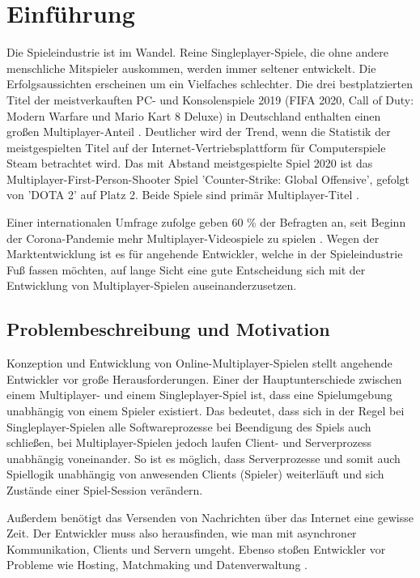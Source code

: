 \chapter{Einführung}
\label{sec:einfuehrung}

Die Spieleindustrie ist im Wandel. Reine Singleplayer-Spiele, die ohne andere menschliche Mitspieler auskommen, werden immer seltener entwickelt. Die Erfolgsaussichten erscheinen um ein Vielfaches schlechter. Die drei bestplatzierten Titel der meistverkauften PC- und Konsolenspiele 2019 (FIFA 2020, Call of Duty: Modern Warfare und Mario Kart 8 Deluxe) in Deutschland enthalten einen großen Multiplayer-Anteil \cite{gameVerbandderdeutschenGamesBranchee.V..2020}. Deutlicher wird der Trend, wenn die Statistik der meistgespielten Titel auf der Internet-Vertriebsplattform für Computerspiele Steam betrachtet wird. Das mit Abstand meistgespielte Spiel 2020 ist das Multiplayer-First-Person-Shooter Spiel 'Counter-Strike: Global Offensive', gefolgt von 'DOTA 2' auf Platz 2. Beide Spiele sind primär Multiplayer-Titel \cite{GitHyp.February2021}.

Einer internationalen Umfrage zufolge geben 60 \% der Befragten an, seit Beginn der Corona-Pandemie mehr Multiplayer-Videospiele zu spielen \cite{SimonKucher&Partners.2020}. Wegen der Marktentwicklung ist es für angehende Entwickler, welche in der Spieleindustrie Fuß fassen möchten, auf lange Sicht eine gute Entscheidung sich mit der Entwicklung von Multiplayer-Spielen auseinanderzusetzen.

\section{Problembeschreibung und Motivation}

Konzeption und Entwicklung von Online-Multiplayer-Spielen stellt angehende Entwickler vor große Herausforderungen. Einer der Hauptunterschiede zwischen einem Multiplayer- und einem Singleplayer-Spiel ist, dass eine Spielumgebung unabhängig von einem Spieler existiert. Das bedeutet, dass sich in der Regel bei Singleplayer-Spielen alle Softwareprozesse bei Beendigung des Spiels auch schließen, bei Multiplayer-Spielen jedoch laufen Client- und Serverprozess unabhängig voneinander. So ist es möglich, dass Serverprozesse und somit auch Spiellogik unabhängig von anwesenden Clients (Spieler) weiterläuft und sich Zustände einer Spiel-Session verändern. 

Außerdem benötigt das Versenden von Nachrichten über das Internet eine gewisse Zeit. Der Entwickler muss also herausfinden, wie man mit asynchroner Kommunikation, Clients und Servern umgeht. Ebenso stoßen Entwickler vor Probleme wie Hosting, Matchmaking und Datenverwaltung \cite{Payne.18.09.2019}.


